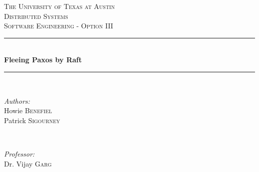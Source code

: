 \begin{titlepage}

\newcommand{\HRule}{\rule{\linewidth}{0.5mm}} %

\center %
 

\textsc{\LARGE The University of Texas at Austin}\\[1.5cm] %
\textsc{\Large Distributed Systems}\\[0.5cm] %
\textsc{\large Software Engineering - Option III}\\[0.5cm] %


\HRule \\[0.4cm]
{ \huge \bfseries Fleeing Paxos by Raft}\\[0.4cm] %
\HRule \\[1.5cm]
 

\begin{minipage}{0.4\textwidth}
\begin{flushleft} \large
\emph{Authors:}\\
Howie \textsc{Benefiel}\\
Patrick \textsc{Sigourney} %
\end{flushleft}
\end{minipage}
~
\begin{minipage}{0.4\textwidth}
\begin{flushright} \large
\emph{Professor:} \\
Dr. Vijay \textsc{Garg} %
\end{flushright}
\end{minipage}\\[2cm]


\end{titlepage}
